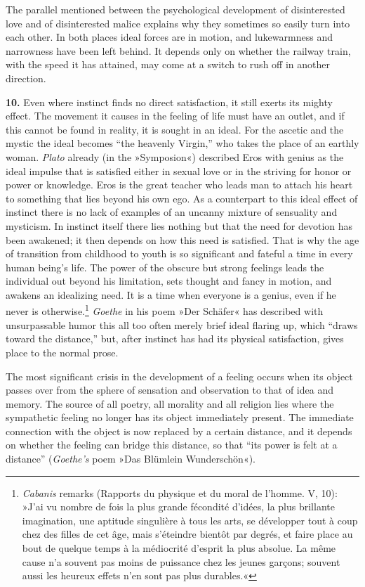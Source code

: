 \documentclass[12pt,a4paper]{book}
\newcommand{\opage}[1]{\marginnote{\footnotesize\textit{[#1]}}}
\begin{document}
The parallel mentioned between the psychological development of
disinterested love and of disinterested malice explains why they
sometimes so easily turn into each other. In both places ideal forces
are in motion, and lukewarmness and narrowness have been left behind. It
depends only on whether the railway train, with the speed it has
attained, may come at a switch to rush off in another direction.

\textbf{10.} Even where instinct finds no direct satisfaction, it still
exerts its mighty effect. The movement it causes in the feeling of life
must have an outlet, and if this cannot be found in reality, it is
sought in an ideal. For the ascetic and the mystic the ideal becomes
``the heavenly Virgin,'' who takes the place of an earthly woman.
\emph{Plato} already (in the »Symposion«) described Eros with genius as
the ideal impulse that is satisfied either in sexual love or in the
striving for honor or power or knowledge. Eros is the great teacher who
leads man to attach his heart to something that lies
\opage{304}beyond his own ego. As a counterpart to this ideal effect of
instinct there is no lack of examples of an uncanny mixture of
sensuality and mysticism. In instinct itself there lies nothing but that
the need for devotion has been awakened; it then depends on how this
need is satisfied. That is why the age of transition from childhood to
youth is so significant and fateful a time in every human being's life.
The power of the obscure but strong feelings leads the individual out
beyond his limitation, sets thought and fancy in motion, and awakens an
idealizing need. It is a time when everyone is a genius, even if he
never is otherwise.\footnote{\emph{Cabanis} remarks (Rapports du
physique et du moral de l'homme. V, 10): »J'ai vu nombre de fois la plus
grande fécondité d'idées, la plus brillante imagination, une aptitude
singulière à tous les arts, se développer tout à coup chez des filles de
cet âge, mais s'éteindre bientôt par degrés, et faire place au bout de
quelque temps à la médiocrité d'esprit la plus absolue. La même cause
n'a souvent pas moins de puissance chez les jeunes garçons; souvent
aussi les heureux effets n'en sont pas plus durables.«} \emph{Goethe}
in his poem »Der Schäfer« has described with unsurpassable humor this
all too often merely brief ideal flaring up, which ``draws toward the
distance,'' but, after instinct has had its physical satisfaction, gives
place to the normal prose.

The most significant crisis in the development of a feeling occurs when
its object passes over from the sphere of sensation and observation to
that of idea and memory. The source of all poetry, all morality and all
religion lies where the sympathetic feeling no longer has its object
immediately present. The immediate connection with the object is now
replaced by a certain distance, and it depends on whether the feeling
can bridge this distance, so that ``its power is felt at a distance''
(\emph{Goethe's} poem »Das Blümlein Wunderschön«).
\end{document}
